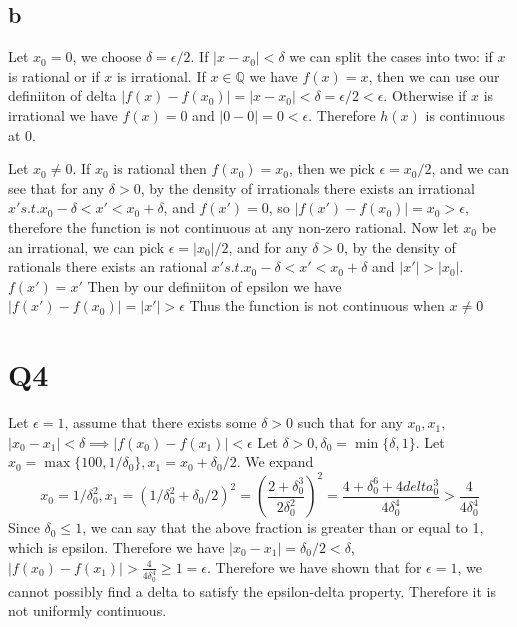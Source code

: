 \documentclass[12pt]{article}
\newcommand{\Q}{\mathbb{Q}}
\begin{document}
\subsection{b}
\par
Let $x_0 = 0$, we choose $\delta = \epsilon/2$. If $|x-x_0|<\delta$ we can split the cases into two: if $x$ is rational or if $x$ is irrational. If $x \in \Q$ we have $f(x) = x$, then we can use our definiiton of delta $|f(x)-f(x_0)| = |x - x_0| < \delta = \epsilon/2 < \epsilon$. Otherwise if $x$ is irrational we have $f(x) = 0$ and $|0-0|=0 < \epsilon$. Therefore $h(x)$ is continuous at $0$.
\par
Let $x_0 \not = 0$. If $x_0$ is rational then $f(x_0) = x_0$, then we pick $\epsilon = x_0/2$, and we can see that for any $\delta > 0$, by the density of irrationals there exists an irrational $x' s.t. x_0 - \delta < x' <x_0+\delta$, and $f(x')=0$, so $|f(x')-f(x_0)|=x_0 > \epsilon$, therefore the function is not continuous at any non-zero rational.
\newline
Now let $x_0$ be an irrational, we can pick $\epsilon = |x_0|/2$, and for any $\delta > 0$, by the density of rationals there exists an rational $x' s.t. x_0 - \delta < x' <x_0+\delta$ and $|x'|>|x_0|$. $f(x') = x'$ Then by our definiiton of epsilon we have $|f(x')-f(x_0)| = |x'| > \epsilon$
\newline
Thus the function is not continuous when $x \not = 0$
\newpage


\section{Q4}
Let $\epsilon = 1$, assume that there exists some $\delta > 0$ such that for any $x_0, x_1$, $|x_0-x_1|<\delta \implies |f(x_0)-f(x_1)|<\epsilon$
\newline
Let $\delta > 0, \delta_0 = \min\{\delta, 1\}$. Let $x_0 = \max \{100, 1/\delta_0\}, x_1 = x_0 + \delta_0/2$.
We expand
$$x_0 = 1/\delta_0^2, x_1 = (1/\delta_0^2+\delta_0/2)^2 = (\frac{2+\delta_0^3}{2\delta_0^2})^2 = \frac{4 + \delta_0^6 + 4delta_0^3}{4 \delta_0^4} > \frac{4}{4\delta_0^4}$$
Since $\delta_0 \leq 1$, we can say that the above fraction is greater than or equal to 1, which is epsilon.
\newline
Therefore we have $|x_0-x_1| = \delta_0/2 < \delta$, $|f(x_0)-f(x_1)| > \frac{4}{4\delta_0^4} \geq 1 = \epsilon$. Therefore we have shown that for $\epsilon = 1$, we cannot possibly find a delta to satisfy the epsilon-delta property. Therefore it is not uniformly continuous.
\newpage
\end{document}
